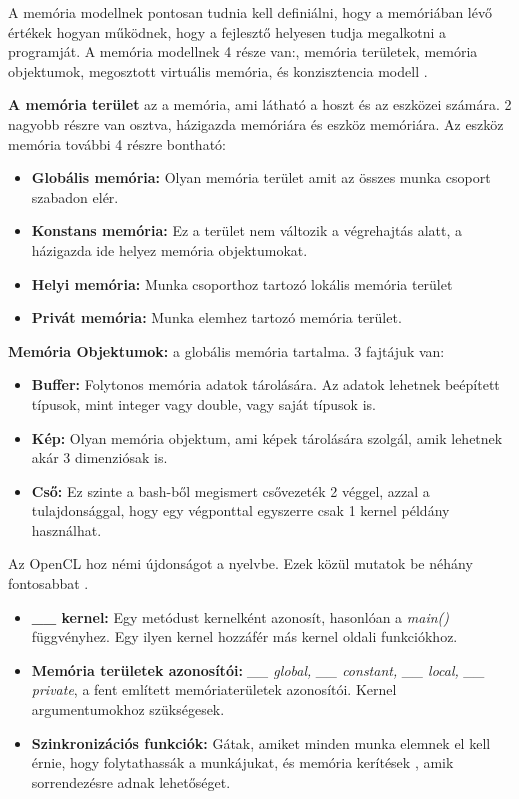 A memória modellnek pontosan tudnia kell definiálni, hogy a memóriában lévő értékek hogyan működnek, hogy a fejlesztő helyesen tudja megalkotni a programját. A memória modellnek 4 része van:, memória területek, memória objektumok, megosztott virtuális memória, és konzisztencia modell \cite{spec_mem}.

\textbf{A memória terület} az a memória, ami látható a hoszt és az eszközei számára. 2 nagyobb részre van osztva, házigazda memóriára és eszköz memóriára. Az eszköz memória további 4 részre bontható:
\begin{itemize}
\item\textbf{Globális memória:} Olyan memória terület amit az összes munka csoport szabadon elér.
\item\textbf{Konstans memória:} Ez a terület nem változik a végrehajtás alatt, a házigazda ide helyez memória objektumokat.
\item\textbf{Helyi memória:} Munka csoporthoz tartozó lokális memória terület
\item\textbf{Privát memória:} Munka elemhez tartozó memória terület.
\end{itemize}
\textbf{Memória Objektumok:} a globális memória tartalma. 3 fajtájuk van:
\begin{itemize}
\item\textbf{Buffer:} Folytonos memória adatok tárolására. Az adatok lehetnek beépített típusok, mint integer vagy double, vagy saját típusok is.
\item\textbf{Kép:} Olyan memória objektum, ami képek tárolására szolgál, amik lehetnek akár 3 dimenziósak is.
\item\textbf{Cső:} Ez szinte a bash-ből megismert csővezeték 2 véggel, azzal a tulajdonsággal, hogy egy végponttal egyszerre csak 1 kernel példány használhat.
\end{itemize}

Az OpenCL hoz némi újdonságot a nyelvbe. Ezek közül mutatok be néhány fontosabbat \cite{opencl_c}.
\begin{itemize}
\item\textbf{\_\_ kernel:} Egy metódust kernelként azonosít, hasonlóan a \textit{main()} függvényhez. Egy ilyen kernel hozzáfér más kernel oldali funkciókhoz.
\item\textbf{Memória területek azonosítói:}\textit{ \_\_ global, \_\_ constant, \_\_ local, \_\_ private}, a fent említett memóriaterületek azonosítói. Kernel argumentumokhoz szükségesek.
\item\textbf{Szinkronizációs funkciók:} Gátak, amiket minden munka elemnek el kell érnie, hogy folytathassák a munkájukat, és memória kerítések \cite{fence}, amik sorrendezésre adnak lehetőséget.
\end{itemize}

